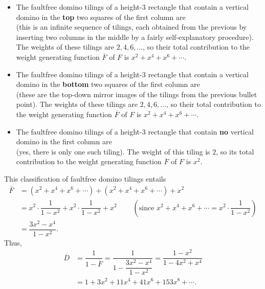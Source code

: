 \begin{itemize}
\item The faultfree domino tilings of a height-$3$ rectangle that contain a
vertical domino in the \textbf{top} two squares of the first column are%
\[%
\qquad%
\qquad%
\]
(this is an infinite sequence of tilings, each obtained from the previous by
inserting two columns in the middle by a fairly self-explanatory procedure).
The weights of these tilings are $2,4,6,\ldots$, so their total contribution
to the weight generating function $\overline{F}$ of $F$ is $x^{2}+x^{4}%
+x^{6}+\cdots$.

\item The faultfree domino tilings of a height-$3$ rectangle that contain a
vertical domino in the \textbf{bottom} two squares of the first column are%
\[%
\qquad%
\qquad%
\]
(these are the top-down mirror images of the tilings from the previous bullet
point). The weights of these tilings are $2,4,6,\ldots$, so their total
contribution to the weight generating function $\overline{F}$ of $F$ is
$x^{2}+x^{4}+x^{6}+\cdots$.

\item The faultfree domino tilings of a height-$3$ rectangle that contain
\textbf{no} vertical domino in the first column are%
\[%
\]
(yes, there is only one such tiling). The weight of this tiling is $2$, so its
total contribution to the weight generating function $\overline{F}$ of $F$ is
$x^{2}$.
\end{itemize}

This classification of faultfree domino tilings entails%
\begin{align*}
\overline{F}  &  =\left(  x^{2}+x^{4}+x^{6}+\cdots\right)  +\left(
x^{2}+x^{4}+x^{6}+\cdots\right)  +x^{2}\\
&  =x^{2}\cdot\dfrac{1}{1-x^{2}}+x^{2}\cdot\dfrac{1}{1-x^{2}}+x^{2}%
\ \ \ \ \ \ \ \ \ \ \left(  \text{since }x^{2}+x^{4}+x^{6}+\cdots=x^{2}%
\cdot\dfrac{1}{1-x^{2}}\right) \\
&  =\dfrac{3x^{2}-x^{4}}{1-x^{2}}.
\end{align*}
Thus,%
\begin{align*}
\overline{D}  &  =\dfrac{1}{1-\overline{F}}=\dfrac{1}{1-\dfrac{3x^{2}-x^{4}%
}{1-x^{2}}}=\dfrac{1-x^{2}}{1-4x^{2}+x^{4}}\\
&  =1+3x^{2}+11x^{4}+41x^{6}+153x^{8}+\cdots.
\end{align*}


